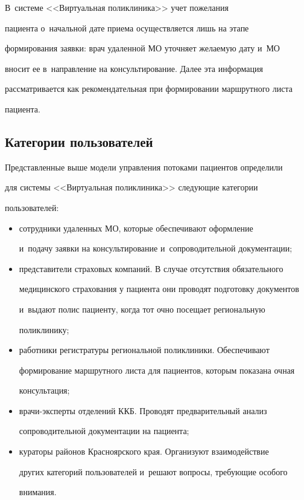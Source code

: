В~системе <<Виртуальная поликлиника>> учет пожелания 


пациента о~начальной дате приема осуществляется лишь на этапе 


формирования заявки: врач удаленной МО уточняет желаемую дату и~МО 


вносит ее в~направление на консультирование. Далее эта информация 


рассматривается как рекомендательная при формировании маршрутного листа 


пациента.





\subsection{Категории пользователей}


  


  Представленные выше модели управления потоками пациентов определили 


для системы <<Виртуальная поликлиника>> следующие категории 


пользователей:


  \begin{itemize}


  \item  сотрудники удаленных МО, которые обеспечивают оформление 


и~подачу заявки на консультирование и~сопроводительной документации;


  \item представители страховых компаний. В случае отсутствия обязательного 


медицинского страхования у пациента они проводят подготовку документов 


и~выдают полис пациенту, когда тот очно посещает региональную 


поликлинику;


  \item работники регистратуры региональной поликлиники. Обеспечивают 


формирование маршрутного листа для пациентов, которым показана очная 


консультация;


  \item врачи-эксперты отделений ККБ. Проводят предварительный анализ 


сопроводительной документации на пациента;


  \item кураторы районов Красноярского края. Организуют взаимодействие 


других категорий пользователей и~решают вопросы, требующие особого 


внимания.


  \end{itemize}


